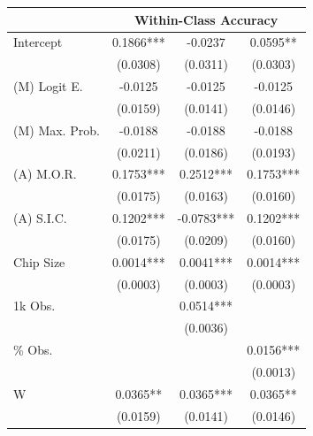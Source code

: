 \documentclass[]{interact}
\theoremstyle{plain}%
\theoremstyle{definition}
\theoremstyle{remark}
\begin{document}
\begin{table}
\begin{tabular}{lccc}
\toprule
{}  &       \multicolumn{3}{c}{Within-Class Accuracy} \\
\midrule
Intercept                                         &   0.1866*** &     -0.0237 &    0.0595** \\
                                                  &    (0.0308) &    (0.0311) &    (0.0303) \\
(M) Logit E.                                      &     -0.0125 &     -0.0125 &     -0.0125 \\
                                                  &    (0.0159) &    (0.0141) &    (0.0146) \\
(M) Max. Prob.                                    &     -0.0188 &     -0.0188 &     -0.0188 \\
                                                  &    (0.0211) &    (0.0186) &    (0.0193) \\
(A) M.O.R.                                        &   0.1753*** &   0.2512*** &   0.1753*** \\
                                                  &    (0.0175) &    (0.0163) &    (0.0160) \\
(A) S.I.C.                                        &   0.1202*** &  -0.0783*** &   0.1202*** \\
                                                  &    (0.0175) &    (0.0209) &    (0.0160) \\
Chip Size                                         &   0.0014*** &   0.0041*** &   0.0014*** \\
                                                  &    (0.0003) &    (0.0003) &    (0.0003) \\
1k Obs.                                           &             &   0.0514*** &             \\
                                                  &             &    (0.0036) &             \\
\% Obs.                                           &             &             &   0.0156*** \\
                                                  &             &             &    (0.0013) \\
W                                                 &    0.0365** &   0.0365*** &    0.0365** \\
                                                  &    (0.0159) &    (0.0141) &    (0.0146) \\

\end{tabular}
\end{table}
\end{document}
